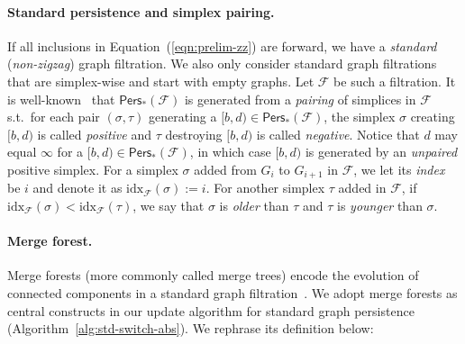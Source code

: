 \documentclass[letterpaper,11pt]{article}
\theoremstyle{mythmstyle}
\theoremstyle{mydefstyle}
\theoremstyle{plain}
\theoremstyle{definition}
\newcommand{\Pers}{\mathsf{Pers}}
\newcommand{\<}[1]{\langle #1\rangle}
\newcommand{\idx}{\mathrm{idx}}
\newcommand{\Fcal}{\mathcal{F}}
\newcommand{\sG}{\sigma}
\newcommand{\tG}{\tau}
\theoremstyle{definition}
\begin{document}
\paragraph{Standard persistence and simplex pairing.}
If all inclusions in Equation~(\ref{eqn:prelim-zz})
are forward, we have a \emph{standard} (\emph{non-zigzag}) graph filtration.
We also only consider standard graph filtrations that are simplex-wise
and start with empty graphs. Let $\Fcal$ be such a filtration.
It is well-known~\cite{edelsbrunner2000topological} that $\Pers_*(\Fcal)$
is generated from a \emph{pairing} of simplices in $\Fcal$ s.t.\ for each pair $(\sG,\tG)$
generating a $[b,d)\in\Pers_*(\Fcal)$,
the simplex $\sG$ creating $[b,d)$ is called \emph{positive} 
and $\tG$ destroying $[b,d)$ is called \emph{negative}.
Notice that $d$ may equal $\infty$ for a $[b,d)\in\Pers_*(\Fcal)$,
in which case $[b,d)$ is generated by an \emph{unpaired} positive simplex.
For a simplex $\sG$ added from $G_{i}$ to $G_{i+1}$ in $\Fcal$, we let its \emph{index}
be $i$ and denote it as $\idx_\Fcal(\sG):=i$.
For another simplex $\tG$ added in $\Fcal$,
if $\idx_\Fcal(\sG)<\idx_\Fcal(\tG)$, 
we say that $\sG$ is \emph{older} than $\tG$
and $\tG$ is \emph{younger} than $\sG$.



\paragraph{Merge forest.}
{Merge forests} (more commonly called {merge trees})
encode 
the 
evolution of connected components in a standard graph filtration~\cite{edelsbrunner2010computational,Parsa13}.
We adopt merge forests as central constructs in our update algorithm for standard graph persistence
(Algorithm~\ref{alg:std-switch-abs}).
We rephrase its definition
below:
\end{document}
